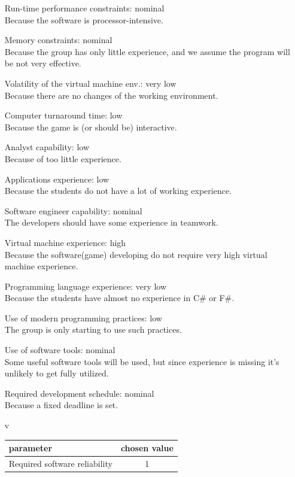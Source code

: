 \documentclass{scrartcl}
\begin{document}
\begin{itemize}
		\item[]Run-time performance constraints:   nominal \\
		Because the software is processor-intensive.
		\item[]Memory constraints:  nominal\\
		Because the group has only little experience, and we assume the program will be not very effective.
		\item[]Volatility of the virtual machine env.:  very low \\
		Because there are no changes of the working environment.
		\item[]Computer turnaround time:  low\\
		Because the game is (or should be) interactive.
		\item[]Analyst capability:  low\\
		Because of too little experience.
		\item[]Applications experience:  low \\
		Because the students do not have a lot of working experience.
		\item[]Software engineer capability:  nominal\\
		The developers should have some experience in teamwork.
		\item[]Virtual machine experience:  high \\
		Because the software(game) developing do not require very high virtual machine experience.
		\item[]Programming language experience:  very low\\
		Because the students have almost no experience in C\# or F\#.
		\item[]Use of modern programming practices:  low\\
		The group is only starting to use such practices.
		\item[]Use of software tools:  nominal\\
		Some useful software tools will be used, but since experience is missing it's unlikely to get fully utilized.
		\item[]Required development schedule:  nominal\\
		Because a fixed deadline is set.


	\item[v]
	\begin{tabular}{l | c}
		parameter & chosen value \\
		\hline

		Required software reliability & 1\\


\end{tabular}
\end{itemize}
\end{document}
